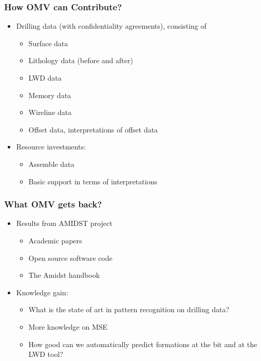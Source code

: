 \documentclass{beamer}
\begin{document}
\begin{frame} \frametitle{How OMV can Contribute?} 
\vspace{-1cm}

\begin{itemize}
\item<1-> Drilling data (with confidentiality agreements), consisting of
\begin{itemize}
\item<1-> Surface data
\item<1-> Lithology data (before and after)
\item<1-> LWD data
\item<2-> Memory data
\item<2-> Wireline data 
\item<2-> Offset data, interpretations of offset data
\end{itemize}
\item<3-> Resource investments:
\begin{itemize}
\item<3->  Assemble data
\item<3-> Basic support in terms of interpretations
\end{itemize}
\end{itemize}

\end{frame}

\begin{frame} \frametitle{What OMV gets back?} 
\vspace{-1cm}

\begin{itemize}
\item<1-> Results from AMIDST project
\begin{itemize}
\item<1-> Academic papers 
\item<1-> Open source software code
\item<1-> The Amidst handbook
\end{itemize}
\item<2-> Knowledge gain:
\begin{itemize}
\item<2-> What is the state of art in pattern recognition on drilling data?
\item<2-> More knowledge on MSE
\item<2-> How good can we automatically predict formations at the bit and at the LWD tool?
\end{itemize}
\end{itemize}

\end{frame}
\end{document}

